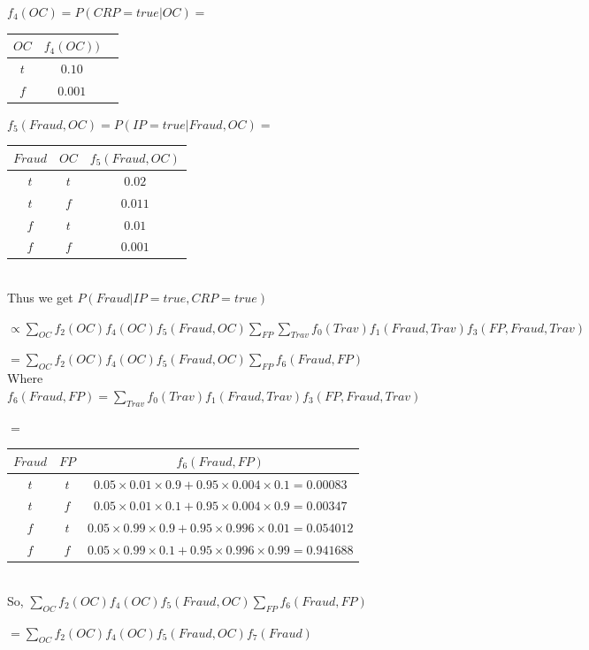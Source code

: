 \documentclass[10pt]{article}
\begin{document}
\begin{enumerate}
	$f_4(OC) = P(CRP = true | OC) = $
	\begin{tabular}{|c|c|c|}
	\hline
 	  $OC$ & $f_4(OC))$ \\
	\hline
	  $t$ & $0.10$  \\
	\hline
	 $f$ & $0.001$  \\
	\hline
	\end{tabular}
	
	$f_5(Fraud, OC) = P(IP = true | Fraud, OC) = $
	\begin{tabular}{|c|c|c|}
	\hline
 	  $Fraud$ & $OC$ & $f_5(Fraud, OC)$ \\
	\hline
	  $t$ & $t$ & $0.02$  \\
	\hline
	 $t$ & $f$ & $0.011$  \\
	\hline
	  $f$ & $t$ & $0.01$ \\
	\hline
	$f$ & $f$ & $0.001$  \\
	\hline
	\end{tabular}\\
	
	Thus we get $P(Fraud | IP = true, CRP = true)$
	
	$\propto \sum_{OC} f_2(OC) f_4(OC) f_5(Fraud, OC) \sum_{FP} \sum_{Trav} f_0(Trav) f_1(Fraud, Trav) f_3(FP, Fraud, Trav)$
	
	$= \sum_{OC} f_2(OC) f_4(OC) f_5(Fraud, OC) \sum_{FP} f_6(Fraud, FP)$\\
	
	Where $f_6(Fraud, FP) = \sum_{Trav} f_0(Trav) f_1(Fraud, Trav) f_3(FP, Fraud, Trav)$
	
	$=$
	\begin{tabular}{|c|c|c|}
	\hline
 	  $Fraud$ & $FP$ & $f_6(Fraud, FP)$ \\
	\hline
	  $t$ & $t$ & $0.05 \times 0.01 \times 0.9 + 0.95 \times 0.004 \times 0.1 = 0.00083$  \\
	\hline
	 $t$ & $f$ & $0.05 \times 0.01 \times 0.1 + 0.95 \times 0.004 \times 0.9 = 0.00347$  \\
	\hline
	  $f$ & $t$ & $0.05 \times 0.99 \times 0.9 + 0.95 \times 0.996 \times 0.01 = 0.054012 $ \\
	\hline
	$f$ & $f$ & $0.05 \times 0.99 \times 0.1 + 0.95 \times 0.996 \times 0.99 = 0.941688 $  \\
	\hline
	\end{tabular}\\	
		
	So, $ \sum_{OC} f_2(OC) f_4(OC) f_5(Fraud, OC) \sum_{FP} f_6(Fraud, FP)$
	
	$= \sum_{OC} f_2(OC) f_4(OC) f_5(Fraud, OC) f_7(Fraud)$\\
	

\end{enumerate}
\end{document}
